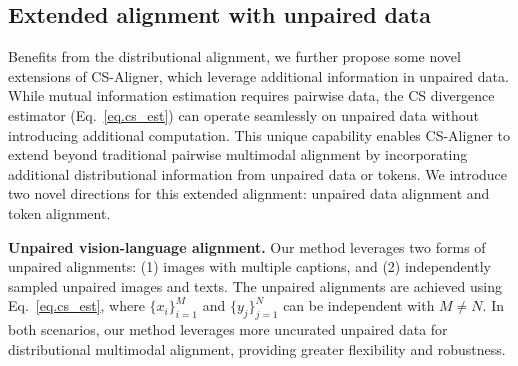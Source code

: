  


\subsection{Extended alignment with unpaired data}


Benefits from the distributional alignment, we further propose some novel extensions of CS-Aligner, which leverage additional information in unpaired data.
While mutual information estimation requires pairwise data, the CS divergence estimator (Eq.~\eqref{eq.cs_est}) can operate seamlessly on unpaired data without introducing additional computation.
%
%
This unique capability enables CS-Aligner to extend beyond traditional pairwise multimodal alignment by incorporating additional distributional information from unpaired data or tokens. 
We introduce two novel directions for this extended alignment: unpaired data alignment and token alignment.

 


\noindent
\textbf{Unpaired vision-language alignment.} Our method leverages two forms of unpaired alignments: (1) images with multiple captions, and (2) independently sampled unpaired images and texts. The unpaired alignments are achieved using Eq.~\eqref{eq.cs_est}, where $\{x_i\}_{i=1}^M$ and $\{y_j\}_{j=1}^N$ can be independent with $M \neq N$. In both scenarios, our method leverages more uncurated unpaired data for distributional multimodal alignment, providing greater flexibility and robustness.

